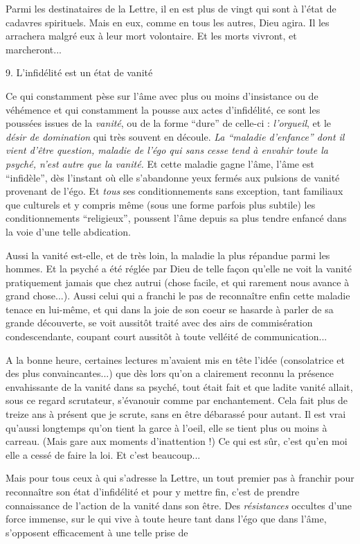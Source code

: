 Parmi les destinataires de la Lettre, il en est plus de vingt qui sont à l'état de cadavres spirituels. Mais en eux, comme en tous les autres, Dieu agira. Il les arrachera malgré eux à leur mort volontaire. Et les morts vivront, et marcheront...

9. L'infidélité est un état de vanité

Ce qui constamment pèse sur l'âme avec plus ou moins d'insistance ou de véhémence et qui constamment la pousse aux actes d'infidélité, ce sont les poussées issues de la \textit{vanité}, ou de la forme ``dure'' de celle-ci : \textit{l'orgueil}, et le \textit{désir de domination} qui très souvent en découle. \textit{La ``maladie d'enfance'' dont il vient d'être question, maladie de l'égo qui sans cesse tend à envahir toute la psyché, n'est autre que la vanité.} Et cette maladie gagne l'âme, l'âme est ``infidèle'', dès l'instant où elle s'abandonne yeux fermés aux pulsions de vanité provenant de l'égo. Et \textit{tous} ses conditionnements sans exception, tant familiaux que culturels et y compris même (sous une forme parfois plus subtile) les conditionnements ``religieux'', poussent l'âme depuis sa plus tendre enfancé dans la voie d'une telle abdication.

Aussi la vanité est-elle, et de très loin, la maladie la plus répandue parmi les hommes. Et la psyché a été réglée par Dieu de telle façon qu'elle ne voit la vanité pratiquement jamais que chez autrui (chose facile, et qui rarement nous avance à grand chose...). Aussi celui qui a franchi le pas de reconnaître enfin cette maladie tenace en lui-même, et qui dans la joie de son coeur se hasarde à parler de sa grande découverte, se voit aussitôt traité avec des airs de commisération condescendante, coupant court aussitôt à toute velléité de communication...

A la bonne heure, certaines lectures m'avaient mis en tête l'idée (consolatrice et des plus convaincantes...) que dès lors qu'on a clairement reconnu la présence envahissante de la vanité dans sa psyché, tout était fait et que ladite vanité allait, sous ce regard scrutateur, s'évanouir comme par enchantement. Cela fait plus de treize ans à présent que je scrute, sans en être débarassé pour autant. Il est vrai qu'aussi longtemps qu'on tient la garce à l'oeil, elle se tient plus ou moins à carreau. (Mais gare aux moments d'inattention !) Ce qui est sûr, c'est qu'en moi elle a cessé de faire la loi. Et c'est beaucoup...

Mais pour tous ceux à qui s'adresse la Lettre, un tout premier pas à franchir pour reconnaître son état d'infidélité et pour y mettre fin, c'est de prendre connaissance de l'action de la vanité dans son être. Des \textit{résistances} occultes d'une force immense, sur le qui vive à toute heure tant dans l'égo que dans l'âme, s'opposent efficacement à une telle prise de

